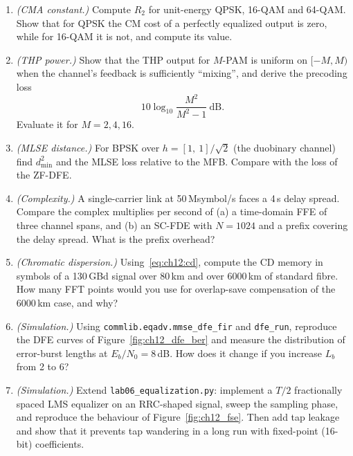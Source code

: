 \begin{enumerate}[label=\thechapter.\arabic*]
\item \emph{(CMA constant.)} Compute $R_2$ for unit-energy QPSK, 16-QAM and 64-QAM. Show that for QPSK
the CM cost of a perfectly equalized output is zero, while for 16-QAM it is not, and compute its value.

\item \emph{(THP power.)} Show that the THP output for $M$-PAM is uniform on $[-M,M)$ when the
channel's feedback is sufficiently ``mixing'', and derive the precoding loss
\[
  10\log_{10}\frac{M^2}{M^2-1}\ \text{dB}.
\]
Evaluate it for $M=2,4,16$.

\item \emph{(MLSE distance.)} For BPSK over $h=[1,\ 1]/\sqrt2$ (the duobinary channel) find
$d^2_{\min}$ and the MLSE loss relative to the MFB. Compare with the loss of the ZF-DFE.

\item \emph{(Complexity.)} A single-carrier link at 50\,Msymbol/s faces a 4\,\textmu s delay spread.
Compare the complex multiplies per second of (a) a time-domain FFE of three channel spans, and (b) an
SC-FDE with $N=1024$ and a prefix covering the delay spread. What is the prefix overhead?

\item \emph{(Chromatic dispersion.)} Using~\eqref{eq:ch12:cd}, compute the CD memory in symbols of
a 130\,GBd signal over 80\,km and over 6000\,km of standard fibre. How many FFT points would you use for
overlap-save compensation of the 6000\,km case, and why?

\item \emph{(Simulation.)} Using \texttt{commlib.eqadv.mmse\_dfe\_fir} and \texttt{dfe\_run}, reproduce
the DFE curves of Figure~\ref{fig:ch12_dfe_ber} and measure the distribution of error-burst lengths at
$E_b/N_0=8$\,dB. How does it change if you increase $L_b$ from 2 to 6?

\item \emph{(Simulation.)} Extend \texttt{lab06\_equalization.py}: implement a $T/2$ fractionally spaced
LMS equalizer on an RRC-shaped signal, sweep the sampling phase, and reproduce the behaviour of
Figure~\ref{fig:ch12_fse}. Then add tap leakage and show that it prevents tap wandering in a long run
with fixed-point (16-bit) coefficients.
\end{enumerate}

